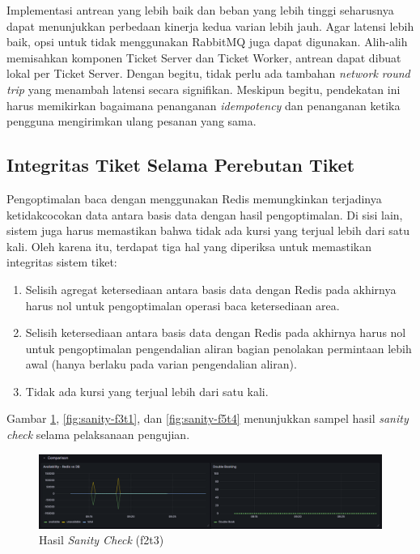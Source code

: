 Implementasi antrean yang lebih baik dan beban yang lebih tinggi seharusnya dapat menunjukkan perbedaan kinerja kedua varian lebih jauh. Agar latensi lebih baik, opsi untuk tidak menggunakan RabbitMQ juga dapat digunakan. Alih-alih memisahkan komponen Ticket Server dan Ticket Worker, antrean dapat dibuat lokal per Ticket Server. Dengan begitu, tidak perlu ada tambahan \textit{network round trip} yang menambah latensi secara signifikan. Meskipun begitu, pendekatan ini harus memikirkan bagaimana penanganan \textit{idempotency} dan penanganan ketika pengguna mengirimkan ulang pesanan yang sama.

\subsection{Integritas Tiket Selama Perebutan Tiket}

Pengoptimalan baca dengan menggunakan Redis memungkinkan terjadinya ketidakcocokan data antara basis data dengan hasil pengoptimalan. Di sisi lain, sistem juga harus memastikan bahwa tidak ada kursi yang terjual lebih dari satu kali. Oleh karena itu, terdapat tiga hal yang diperiksa untuk memastikan integritas sistem tiket:

\begin{enumerate}
    \item Selisih agregat ketersediaan antara basis data dengan Redis pada akhirnya harus nol untuk pengoptimalan operasi baca ketersediaan area.
    \item Selisih ketersediaan antara basis data dengan Redis pada akhirnya harus nol untuk pengoptimalan pengendalian aliran bagian penolakan permintaan lebih awal (hanya berlaku pada varian pengendalian aliran).
    \item Tidak ada kursi yang terjual lebih dari satu kali.
\end{enumerate}

Gambar \ref{fig:sanity-f2t3}, \ref{fig:sanity-f3t1}, dan \ref{fig:sanity-f5t4} menunjukkan sampel hasil \textit{sanity check} selama pelaksanaan pengujian.

\begin{figure}[htbp]
    \centering
    \includegraphics[width=1\textwidth]{resources/chapter-4/sanity-f2t3.png}
    \caption{Hasil \textit{Sanity Check} (f2t3)}
    \label{fig:sanity-f2t3}
\end{figure}

